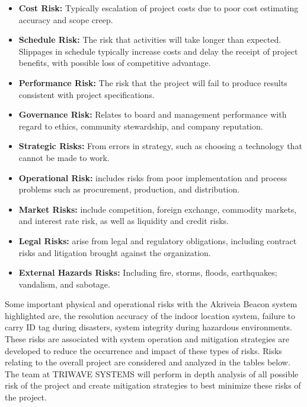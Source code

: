 \begin{itemize}
\setlength\itemsep{0.1mm}
	\item \textbf{Cost Risk:} Typically escalation of project costs due to poor cost estimating accuracy and scope creep.
	\item \textbf{Schedule Risk:} The risk that activities will take longer than expected. Slippages in schedule typically increase costs and delay the receipt of project benefits, with possible loss of competitive advantage.
	\item \textbf{Performance Risk:} The risk that the project will fail to produce results consistent with project specifications.
	\item \textbf{Governance Risk:} Relates to board and management performance with regard to ethics, community stewardship, and company reputation.
	\item \textbf{Strategic Risks:} From errors in strategy, such as choosing a technology that cannot be made to work.
	\item \textbf{Operational Risk:} includes risks from poor implementation and process problems such as procurement, production, and distribution.
	\item \textbf{Market Risks:} include competition, foreign exchange, commodity markets, and interest rate risk, as well as liquidity and credit risks.
	\item \textbf{Legal Risks:} arise from legal and regulatory obligations, including contract risks and litigation brought against the organization.
	\item \textbf{External Hazards Risks:} Including fire, storms, floods, earthquakes; vandalism, and sabotage.
\end{itemize}

Some important physical and operational risks with the Akriveia Beacon system highlighted are, the resolution accuracy of the indoor location system, failure to carry ID tag during disasters, system integrity during hazardous environments. These risks are associated with system operation and mitigation strategies are developed to reduce the occurrence and impact of these types of risks. Risks relating to the overall project are considered and analyzed in the tables below. The team at TRIWAVE SYSTEMS will perform in depth analysis of all possible risk of the project and create mitigation strategies to best minimize these risks of the project.

